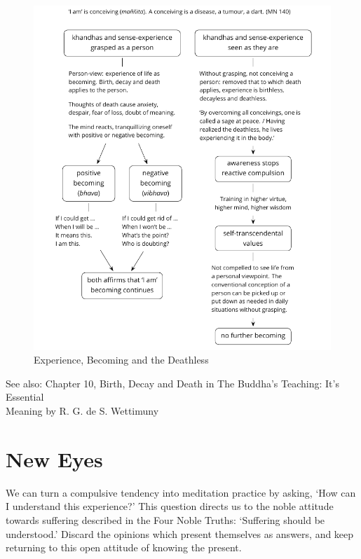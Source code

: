 \begin{figure}[h]
\caption{Experience, Becoming and the Deathless}\label{fig-experience-becoming-deathless}
\bigskip
\includegraphics[width=\linewidth]{./manuscript/tex/diagrams/experience-becoming-deathless.pdf}
\end{figure}

{\noindent\footnotesize
See also: Chapter 10, Birth, Decay and Death in The Buddha's Teaching: It's Essential\\ Meaning by R. G. de S. Wettimuny
\par}


\clearpage
\normalpagelayout

\section{New Eyes}


\noindent We can turn a compulsive tendency into meditation practice by
asking, `How can I understand this experience?' This question directs us
to the noble attitude towards suffering described in the Four Noble
Truths: `Suffering should be understood.' Discard the opinions which
present themselves as answers, and keep returning to this open attitude
of knowing the present.

